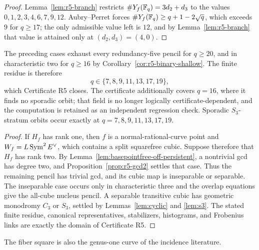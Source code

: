 \begin{proof}
Lemma~\ref{lem:r5-branch} restricts $\#Y_f(\mathbb F_q)=3d_2+d_3$ to the
values $0,1,2,3,4,6,7,9,12$.  Aubry--Perret forces
$\#Y_f(\mathbb F_q)\geq q+1-2\sqrt q$, which exceeds $9$ for $q\geq17$; the
only admissible value left is $12$, and by Lemma~\ref{lem:r5-branch}
that value is attained only at $(d_2,d_3)=(4,0)$.
\end{proof}

\begin{proposition}\label{prop:r5-bridge}%
%
%
The preceding cases exhaust every redundancy-five pencil for
$q\geq20$, and in characteristic two for $q\geq16$ by
Corollary~\ref{cor:r5-binary-shallow}.  The finite residue is therefore
\[
       q\in\{7,8,9,11,13,17,19\},
\]
which Certificate R5 closes.  The certificate additionally covers
$q=16$, where it finds no sporadic orbit; that field is no longer
logically certificate-dependent, and the computation is retained as an
independent regression check.  Sporadic $S_3$-stratum orbits occur
exactly at $q=7,8,9,11,13,17,19$.
\end{proposition}

\begin{proof}
If \(H_f\) has rank one, then \(f\) is a normal-rational-curve point and
\(W_f=L\operatorname{Sym}^2E^\vee\), which contains a split squarefree cubic.  Suppose
therefore that \(H_f\) has rank two.  By
Lemma~\ref{lem:basepointfree-off-persistent}, a nontrivial gcd has degree two,
and Proposition~\ref{prop:r5-gcd2} settles that case.  Thus the remaining
pencil has trivial gcd, and its cubic map is inseparable or separable.  The
inseparable case occurs only in characteristic three
and the overlap equations give the all-cube nucleus pencil.  A
separable transitive cubic has geometric monodromy $C_3$ or $S_3$,
settled by Lemmas~\ref{lem:cyclic} and \ref{lem:s3}.  The stated finite
residue, canonical representatives, stabilizers, histograms, and
Frobenius links are exactly the domain of Certificate R5.
\end{proof}

The fiber square is also the genus-one curve of the incidence literature.


